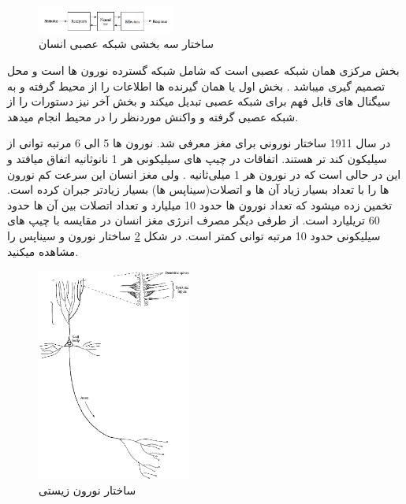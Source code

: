 \documentclass[11pt,a4paper,twocolumn]{article}
\begin{document}
\begin{figure}
  \centering
    \includegraphics[width=0.4\textwidth]{three-parts.png}
  \caption{ساختار سه بخشی شبکه عصبی انسان}
  \label{fig:three-parts}
\end{figure}
بخش مرکزی همان شبکه عصبی است که شامل شبکه گسترده نورون ها است و محل تصمیم گیری میباشد . بخش اول یا همان گیرنده ها اطلاعات را از محیط گرفته و به سیگنال های قابل فهم برای شبکه عصبی تبدیل میکند و بخش آخر نیز دستورات را از شبکه عصبی گرفته و واکنش موردنظر را در محیط انجام میدهد.

در سال 1911 ساختار نورونی 
برای مغز معرفی شد.  نورون ها 5 الی 6 مرتبه توانی از سیلیکون کند تر هستند. اتفاقات در چیپ های سیلیکونی هر 1 نانوثانیه اتفاق میافتد و این در حالی است که در نورون هر 1 میلی‌‌ثانیه . ولی مغز انسان این سرعت کم نورون ها را  با تعداد بسیار زیاد آن ها و اتصلات(سیناپس ها) بسیار زیادتر جبران کرده است. تخمین زده میشود که تعداد نورون ها حدود 10 میلیارد و تعداد اتصلات بین آن ها حدود 60 تریلیارد است. از طرفی دیگر مصرف انرژی مغز انسان در مقایسه با چیپ های سیلیکونی حدود 10 مرتبه توانی کمتر است. در شکل
\ref{fig:bio-neuron}
ساختار نورون و سیناپس را مشاهده میکنید.

\begin{figure}
  \centering
    \includegraphics[width=0.45\textwidth, height=0.5\textwidth]{bio-neuron.png}
  \caption{ساختار نورون زیستی}
  \label{fig:bio-neuron}
\end{figure}
\end{document}
